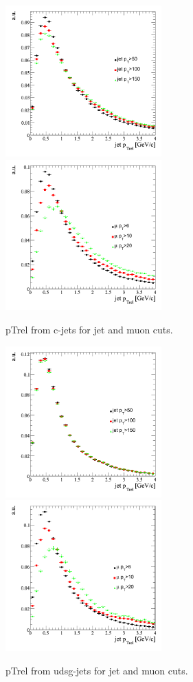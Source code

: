 \begin{figure}[htbp]
  \begin{center}
    \includegraphics[width=60mm]{Figures/jet_ptrelc_jetcuts.png}
    \includegraphics[width=60mm]{Figures/jet_ptrelc_mucuts.png}
  \end{center}
  \caption{pTrel from c-jets for jet and muon cuts.}
  \label{fig:jet_ptrel}
\end{figure}

\begin{figure}[htbp]
  \begin{center}
    \includegraphics[width=60mm]{Figures/jet_ptreludsg_jetcuts.png}
    \includegraphics[width=60mm]{Figures/jet_ptreludsg_mucuts.png}
  \end{center}
  \caption{pTrel from udsg-jets for jet and muon cuts.}
  \label{fig:jet_ptrel}
\end{figure}

